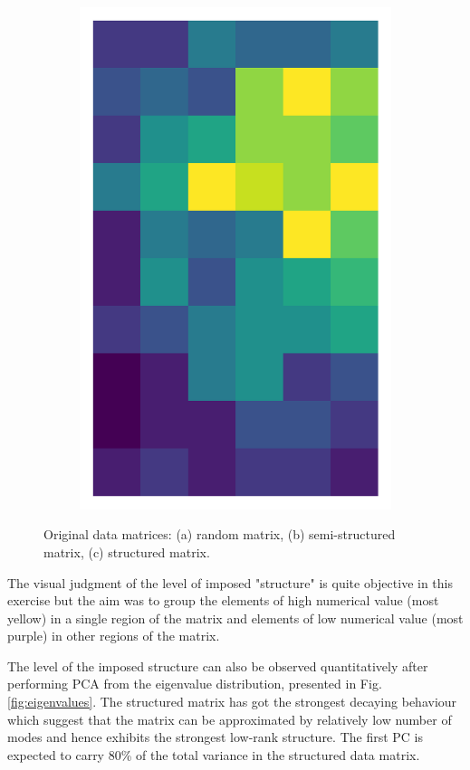 \documentclass[10pt,twocolumn]{article}
\begin{document}
\begin{figure}[H]
\begin{subfigure}[t]{.15\textwidth}
\includegraphics[scale=.2]{structured-matrix-original.png}
\caption{ }
\end{subfigure}
\caption{Original data matrices: (a) random matrix, (b) semi-structured matrix, (c) structured matrix.}
\label{fig:matrices}
\end{figure}

The visual judgment of the level of imposed "structure" is quite objective in this exercise but the aim was to group the elements of high numerical value (most yellow) in a single region of the matrix and elements of low numerical value (most purple) in other regions of the matrix.

The level of the imposed structure can also be observed quantitatively after performing PCA from the eigenvalue distribution, presented in Fig.\ref{fig:eigenvalues}. The structured matrix has got the strongest decaying behaviour which suggest that the matrix can be approximated by relatively low number of modes and hence exhibits the strongest low-rank structure. The first PC is expected to carry 80\% of the total variance in the structured data matrix.
\end{document}
